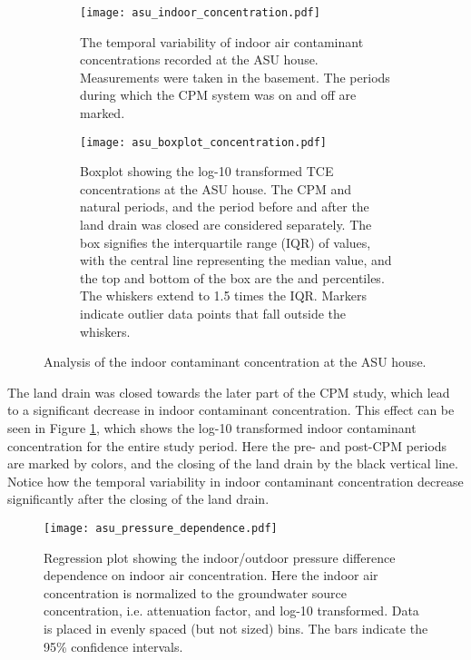 \begin{figure}[htb!]
  \begin{subfigure}[t]{\textwidth}
    \centering
    \texttt{[image: asu\_indoor\_concentration.pdf]}
    \caption{The temporal variability of indoor air contaminant concentrations recorded at the ASU house. Measurements were taken in the basement. The periods during which the CPM system was on and off are marked.}
    \label{fig:asu_indoor_concentration}
  \end{subfigure}
  \begin{subfigure}[t]{\textwidth}
    \texttt{[image: asu\_boxplot\_concentration.pdf]}
    \caption{Boxplot showing the log-10 transformed TCE concentrations at the ASU house. The CPM and natural periods, and the period before and after the land drain was closed are considered separately. The box signifies the interquartile range (IQR) of values, with the central line representing the median value, and the top and bottom of the box are the  and  percentiles. The whiskers extend to 1.5 times the IQR. Markers indicate outlier data points that fall outside the whiskers.}
    \label{fig:asu_concentration_boxplot}
  \end{subfigure}
  \caption{Analysis of the indoor contaminant concentration at the ASU house.}
\end{figure}

The land drain was closed towards the later part of the CPM study, which lead to a significant decrease in indoor contaminant concentration.
This effect can be seen in Figure \ref{fig:asu_indoor_concentration}, which shows the log-10 transformed indoor contaminant concentration for the entire study period.
Here the pre- and post-CPM periods are marked by colors, and the closing of the land drain by the black vertical line.
Notice how the temporal variability in indoor contaminant concentration decrease significantly after the closing of the land drain.\par

\begin{figure}[htb!]
  \centering
  \texttt{[image: asu\_pressure\_dependence.pdf]}
  \caption[Regression plot showing the indoor/outdoor pressure difference dependence on indoor air concentration.]{Regression plot showing the indoor/outdoor pressure difference dependence on indoor air concentration. Here the indoor air concentration is normalized to the groundwater source concentration, i.e. attenuation factor, and log-10 transformed. Data is placed in evenly spaced (but not sized) bins. The bars indicate the 95\% confidence intervals.}
  \label{fig:asu_pressure_dependence}
\end{figure}

